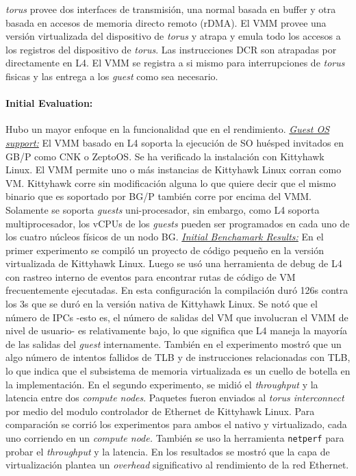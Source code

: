 \emph{torus} provee dos interfaces de transmisión, una normal basada en buffer y otra basada en accesos de memoria directo remoto (rDMA). El VMM provee una versión virtualizada del dispositivo de \emph{torus} y atrapa y emula todo los accesos a los registros del dispositivo de \emph{torus}. Las instrucciones DCR son atrapadas por directamente en L4. El VMM se registra a si mismo para interrupciones de \emph{torus} fisicas y las entrega a los \emph{guest} como sea necesario.

\paragraph{\textnormal{\textbf{Initial Evaluation:}}}
Hubo un mayor enfoque en la funcionalidad que en el rendimiento. \underline{\emph{Guest OS support:}} El VMM basado en L4 soporta la ejecución de SO huésped invitados en GB/P como CNK o ZeptoOS. Se ha verificado la instalación con Kittyhawk Linux. El VMM permite uno o más instancias de Kittyhawk Linux corran como VM. Kittyhawk corre sin modificación alguna lo que quiere decir que el mismo binario que es soportado por BG/P también corre por encima del VMM. Solamente se soporta \emph{guests} uni-procesador, sin embargo, como L4 soporta multiprocesador, los vCPUs de los \emph{guests} pueden ser programados en cada uno de los cuatro núcleos físicos de un nodo BG. \underline{\emph{Initial Benchamark Results:}} En el primer experimento se compiló un proyecto de código pequeño en la versión virtualizada de Kittyhawk Linux. Luego se usó una herramienta de debug de L4 con rastreo interno de eventos para encontrar rutas de código de VM frecuentemente ejecutadas. En esta configuración la compilación duró 126s contra los 3s que se duró en la versión nativa de Kittyhawk Linux. Se notó que el número de IPCs -esto es, el número de salidas del VM que involucran el VMM de nivel de usuario- es relativamente bajo, lo que significa que L4 maneja la mayoría de las salidas del \emph{guest} internamente. También en el experimento mostró que un algo número de intentos fallidos de TLB y de instrucciones relacionadas con TLB, lo que indica que el subsistema de memoria virtualizada es un cuello de botella en la implementación. En el segundo experimento, se midió el \emph{throughput} y la latencia entre dos \emph{compute nodes}. Paquetes fueron enviados al \emph{torus interconnect} por medio del modulo controlador de Ethernet de Kittyhawk Linux. Para comparación se corrió los experimentos para ambos el nativo y virtualizado, cada uno corriendo en un \emph{compute node.} También se uso la herramienta \texttt{netperf} para probar el \emph{throughput} y la latencia. En los resultados se mostró que la capa de virtualización plantea un \emph{overhead} significativo al rendimiento de la red Ethernet. 


